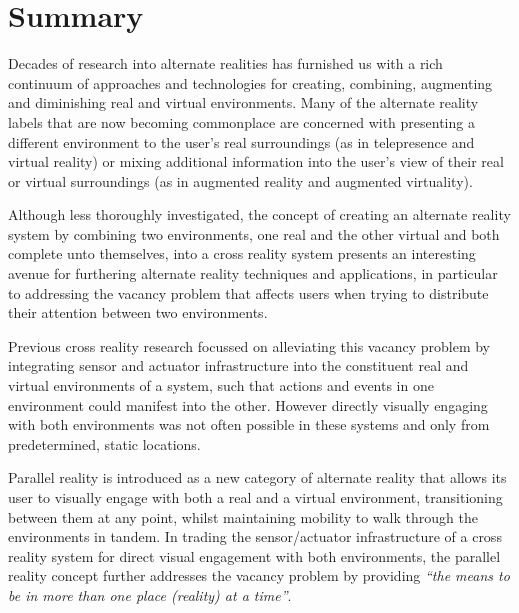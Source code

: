 
\section{Summary}
Decades of research into alternate realities has furnished us with a rich continuum of approaches and technologies for creating, combining, augmenting and diminishing real and virtual environments. Many of the alternate reality labels that are now becoming commonplace are concerned with presenting a different environment to the user's real surroundings (as in telepresence and virtual reality) or mixing additional information into the user's view of their real or virtual surroundings (as in augmented reality and augmented virtuality).

Although less thoroughly investigated, the concept of creating an alternate reality system by combining two environments, one real and the other virtual and both complete unto themselves, into a cross reality system presents an interesting avenue for furthering alternate reality techniques and applications, in particular to addressing the vacancy problem that affects users when trying to distribute their attention between two environments.

Previous cross reality research focussed on alleviating this vacancy problem by integrating sensor and actuator infrastructure into the constituent real and virtual environments of a system, such that actions and events in one environment could manifest into the other. However directly visually engaging with both environments was not often possible in these systems and only from predetermined, static locations.

Parallel reality is introduced as a new category of alternate reality that allows its user to visually engage with both a real and a virtual environment, transitioning between them at any point, whilst maintaining mobility to walk through the environments in tandem. In trading the sensor/actuator infrastructure of a cross reality system for direct visual engagement with both environments, the parallel reality concept further addresses the vacancy problem by providing \textit{``the means to be in more than one place (reality) at a time''}\cite{Lifton2007a}.